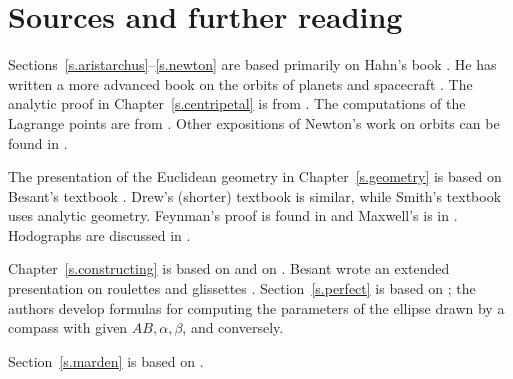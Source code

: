 
\chapter*{Sources and further reading}


Sections~\ref{s.aristarchus}--\ref{s.newton} are based primarily on Hahn's book \cite{hahn-cic}. He has written a more advanced book on the orbits of planets and spacecraft \cite{hahn-orbits}. The analytic proof in Chapter~\ref{s.centripetal} is from \cite{griffiths}. The computations of the Lagrange points are from \cite{stern}. Other expositions of Newton's work on orbits can be found in \cite{hauser-lang,stein}. 

The presentation of the Euclidean geometry in Chapter~\ref{s.geometry} is based on Besant's textbook \cite{besant}. Drew's (shorter) textbook \cite{drew} is similar, while Smith's textbook \cite{smith} uses analytic geometry. Feynman's proof is found in \cite{lost} and Maxwell's is in \cite[Article CXXXIII]{maxwell}. Hodographs are discussed in \cite{hodograph}.

Chapter~\ref{s.constructing} is based on \cite[Chapter~X]{besant} and on \cite{van-maanen}. Besant wrote an extended presentation on roulettes and glissettes \cite{besant-r-g}. Section~\ref{s.perfect} is based on \cite{henk}; the authors develop formulas for computing the parameters of the ellipse drawn by a compass with given $AB,\alpha,\beta$, and conversely.

Section~\ref{s.marden} is based on \cite{marden}.

\begin{small}


\end{small}
